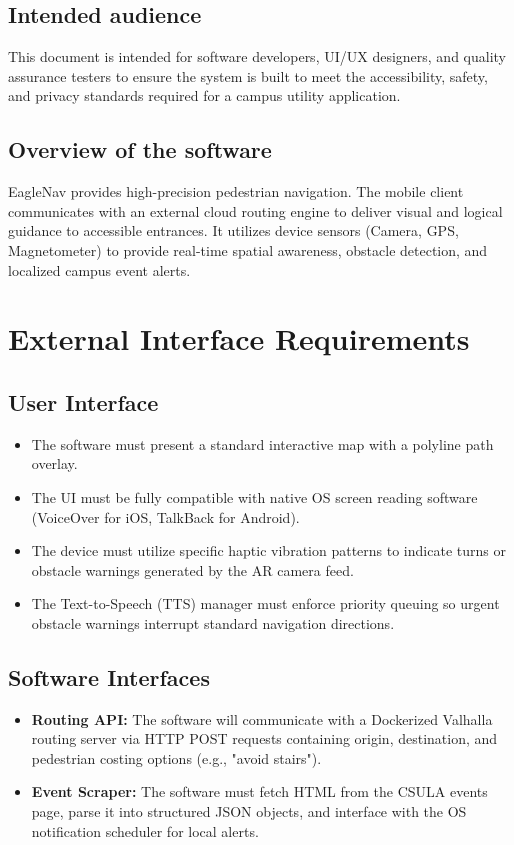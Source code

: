 \documentclass[12pt]{article}
\begin{document}
\subsection{Intended audience}
This document is intended for software developers, UI/UX designers, and quality assurance testers to ensure the system is built to meet the accessibility, safety, and privacy standards required for a campus utility application.

\subsection{Overview of the software}
EagleNav provides high-precision pedestrian navigation. The mobile client communicates with an external cloud routing engine to deliver visual and logical guidance to accessible entrances. It utilizes device sensors (Camera, GPS, Magnetometer) to provide real-time spatial awareness, obstacle detection, and localized campus event alerts.

\section{External Interface Requirements}

\subsection{User Interface}
\begin{itemize}[noitemsep]
    \item The software must present a standard interactive map with a polyline path overlay.
    \item The UI must be fully compatible with native OS screen reading software (VoiceOver for iOS, TalkBack for Android).
    \item The device must utilize specific haptic vibration patterns to indicate turns or obstacle warnings generated by the AR camera feed.
    \item The Text-to-Speech (TTS) manager must enforce priority queuing so urgent obstacle warnings interrupt standard navigation directions.
\end{itemize}

\subsection{Software Interfaces}
\begin{itemize}[noitemsep]
    \item \textbf{Routing API:} The software will communicate with a Dockerized Valhalla routing server via HTTP POST requests containing origin, destination, and pedestrian costing options (e.g., "avoid stairs").
    \item \textbf{Event Scraper:} The software must fetch HTML from the CSULA events page, parse it into structured JSON objects, and interface with the OS notification scheduler for local alerts.
\end{itemize}
\end{document}
